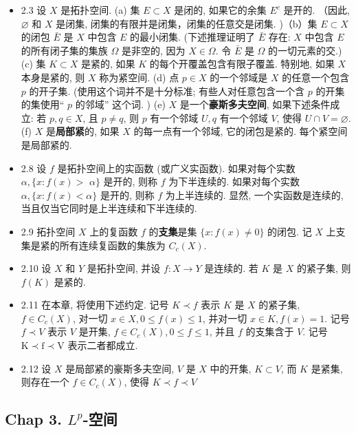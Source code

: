 \begin{itemize}
\item 2.3 设 $X$ 是拓扑空间. (a) 集 $E \subset X$ 是闭的, 如果它的余集 $E^{c}$ 是开的. （因此, $\varnothing$ 和 $X$ 是闭集, 闭集的有限并是闭集，闭集的任意交是闭集. )（b）集 $E \subset X$ 的闭包 $\bar{E}$ 是 $X$ 中包含 $E$ 的最小闭集. (下述推理证明了 $\bar{E}$ 存在: $X$ 中包含 $E$ 的所有闭子集的集族 $\Omega$ 是非空的, 因为 $X \in \Omega$. 令 $\bar{E}$ 是 $\Omega$ 的一切元素的交.) (c) 集 $K \subset X$ 是紧的, 如果 $K$ 的每个开覆盖包含有限子覆盖. 特别地, 如果 $X$ 本身是紧的, 则 $X$ 称为紧空间. (d) 点 $p \in X$ 的一个邻域是 $X$ 的任意一个包含 $p$ 的开子集. (使用这个词并不是十分标准; 有些人对任意包含一个含 $p$ 的开集的集使用“ $p$ 的邻域” 这个词. ) (e) $X$ 是一个\textbf{豪斯多夫空间}, 如果下述条件成立: 若 $p, q \in X$, 且 $p \neq q$, 则 $p$ 有一个邻域 $U, q$ 有一个邻域 $V$, 使得 $U \cap V=\varnothing$. (f) $X$ 是\textbf{局部紧}的, 如果 $X$ 的每一点有一个邻域, 它的闭包是紧的. 每个紧空间是局部紧的.

\item 2.8 设 $f$ 是拓扑空间上的实函数 (或广义实函数). 如果对每个实数 $\alpha,\{x: f(x)>$ $\alpha\}$ 是开的, 则称 $f$ 为下半连续的. 如果对每个实数 $\alpha,\{x: f(x)<\alpha\}$ 是开的, 则称 $f$ 为上半连续的. 显然, 一个实函数是连续的, 当且仅当它同时是上半连续和下半连续的.

\item 2.9 拓扑空间 $X$ 上的复函数 $f$ 的\textbf{支集}是集 $\{x: f(x) \neq 0\}$ 的闭包. 记 $X$ 上支集是紧的所有连续复函数的集族为 $C_{c}(X)$.

\item 2.10 设 $X$ 和 $Y$ 是拓扑空间, 并设 $f: X \rightarrow Y$ 是连续的. 若 $K$ 是 $X$ 的紧子集, 则 $f(K)$ 是紧的.

\item 2.11 在本章, 将使用下述约定. 记号 $K \prec f$ 表示 $K$ 是 $X$ 的紧子集, $f \in C_{c}(X)$, 对一切 $x \in X, 0 \leqslant f(x) \leqslant 1$, 并对一切 $x \in K, f(x)=1$. 记号 $f \prec V$ 表示 $V$ 是开集, $f \in C_{c}(X), 0 \leqslant f \leqslant 1$, 并且 $f$ 的支集含于 $V$. 记号 $\mathrm{K}\prec\mathrm{f}\prec\mathrm{V}$ 表示二者都成立.

\item 2.12 设 $X$ 是局部紧的豪斯多夫空间, $V$ 是 $X$ 中的开集, $K \subset V$, 而 $K$ 是紧集, 则存在一个 $f \in C_{c}(X)$, 使得 $K \prec f \prec V$
\end{itemize}

\subsection{Chap 3. $L^p$-空间}

